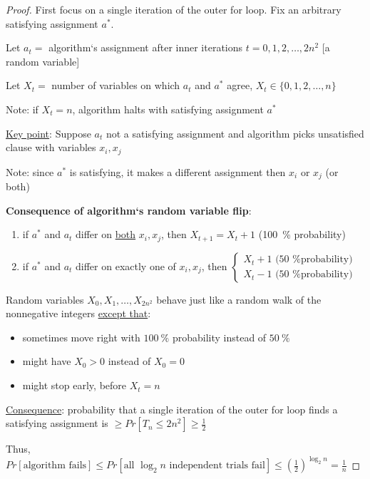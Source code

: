 \documentclass[a4paper,12pt]{article}
\theoremstyle{plain}
\theoremstyle{definition}
\theoremstyle{remark}
\begin{document}
\begin{proof}
First focus on a single iteration of the outer for loop. Fix an arbitrary satisfying assignment $a^*$.

Let $a_t =$ algorithm`s assignment after inner iterations $t = 0, 1, 2, \dots, 2n^2$ [a random variable]

Let $X_t =$ number of variables on which $a_t$ and $a^*$ agree, $X_t \in \{0, 1, 2, \dots, n\}$

Note: if $X_t = n$, algorithm halts with satisfying assignment $a^*$

\underline{Key point}: Suppose $a_t$ not a satisfying assignment and algorithm picks unsatisfied clause with variables $x_i, x_j$

Note: since $a^*$ is satisfying, it makes a different assignment then $x_i$ or $x_j$ (or both)

\textbf{Consequence of algorithm`s random variable flip}:
\begin{enumerate}
	\item if $a^*$ and $a_t$ differ on \underline{both} $x_i, x_j$, then $X_{t+1} = X_t + 1$ (100~\% probability)
	\item if $a^*$ and $a_t$ differ on exactly one of $x_i, x_j$, then $\left\{\begin{aligned}X_t + 1 \text{ (50~\% probability)}\\X_t - 1 \text{ (50~\% probability)}\end{aligned}\right.$
\end{enumerate}

Random variables $X_0, X_1, \dots, X_{2n^2}$ behave just like a random walk of the nonnegative integers \underline{except that}:
\begin{itemize}
	\item sometimes move right with $100~\%$ probability instead of $50~\%$
	\item might have $X_0 > 0$ instead of $X_0 = 0$
	\item might stop early, before $X_t = n$
\end{itemize}

\underline{Consequence}: probability that a single iteration of the outer for loop finds a satisfying assignment is $\geq Pr[T_n \leq 2n^2] \geq \frac{1}{2}$

Thus, $Pr[\text{algorithm fails}] \leq Pr[\text{all } \log_2 n \text{ independent trials fail}] \leq (\frac{1}{2})^{\log_2 n} = \frac{1}{n}$
\end{proof}
\end{document}
